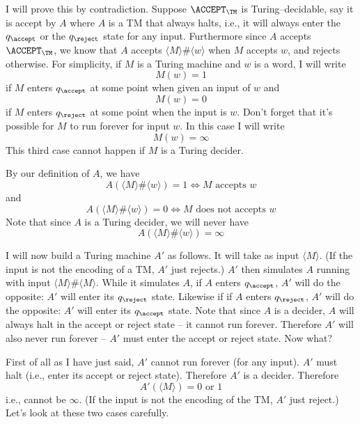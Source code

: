 I will prove this by contradiction.
Suppose
$\ACCEPT_\TM$
is Turing--decidable, say it is accept by $A$
where $A$ is a TM that always halts, i.e., it will always enter the
$q_\accept$ or the $q_\reject$ state for any input.
Furthermore since $A$ accepts $\ACCEPT_\TM$, we know that 
$A$ accepts $\langle M  \rangle \#\langle w \rangle$
when $M$ accepts $w$, and rejects otherwise.
For simplicity, if $M$ is a Turing machine and $w$ is a word,
I will write
\[
M(w) = 1
\]
if $M$ enters $q_\accept$ at some point when given an input of $w$
and 
\[
M(w) = 0
\]
if $M$ enters $q_\reject$ at some point when the input is $w$.
Don't forget that it's possible for $M$ to run forever
for input $w$.
In this case I will write
\[
M(w) = \infty
\]
This third case cannot happen if $M$ is a Turing decider.

By our definition of $A$, 
we have
\[
A(\langle M \rangle \# \langle w\rangle) = 1
\iff M \text{ accepts } w
\]
and 
\[
A(\langle M \rangle \# \langle w\rangle) = 0
\iff M \text{ does not accepts } w
\]
Note that since $A$ is a Turing decider, we will never have
\[
A(\langle M \rangle \# \langle w\rangle) = \infty
\]

I will now build a Turing machine $A'$ as follows.
It will take as input 
$\langle M \rangle$.
(If the input is not the encoding of a TM, $A'$ just rejects.)
$A'$ then simulates $A$ running with input $\langle M \rangle \# \langle M \rangle$.
While it simulates $A$, if $A$ enters $q_\accept$, 
$A'$ will do the opposite: 
$A'$ will enter its $q_\reject$ state.
Likewise if 
if $A$ enters $q_\reject$, 
$A'$ will do the opposite: $A'$ 
will enter its $q_\accept$ state.
Note that since $A$ is a decider, $A$ will always halt in the
accept or reject state -- it cannot run forever.
Therefore $A'$ will also never run forever -- $A'$ must
enter the accept or reject state.
Now what?


First of all as I have just said, $A'$ cannot run forever (for any input).
$A'$ must halt (i.e., enter its accept or reject state).
Therefore $A'$ is a decider.
Therefore
\[
A'(\langle M \rangle) = 0 \text{ or } 1
\]
i.e., cannot be $\infty$.
(If the input is not the encoding of the TM, $A'$ just reject.)
Let's look at these two cases carefully.

